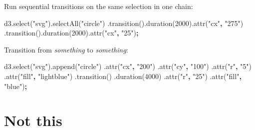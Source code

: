 \documentclass[openany]{book}
\newenvironment{Shaded}{\begin{snugshade}}{\end{snugshade}}
\newcommand{\AttributeTok}[1]{\textcolor[rgb]{0.77,0.63,0.00}{#1}}
\newcommand{\DecValTok}[1]{\textcolor[rgb]{0.00,0.00,0.81}{#1}}
\newcommand{\NormalTok}[1]{#1}
\newcommand{\OperatorTok}[1]{\textcolor[rgb]{0.81,0.36,0.00}{\textbf{#1}}}
\newcommand{\StringTok}[1]{\textcolor[rgb]{0.31,0.60,0.02}{#1}}
\newcommand{\VariableTok}[1]{\textcolor[rgb]{0.00,0.00,0.00}{#1}}
\begin{document}
Run sequential transitions on the same selection in one chain:

\begin{Shaded}
\begin{Highlighting}[]
\VariableTok{d3}\NormalTok{.}\AttributeTok{select}\NormalTok{(}\StringTok{"svg"}\NormalTok{).}\AttributeTok{selectAll}\NormalTok{(}\StringTok{"circle"}\NormalTok{)}
\NormalTok{  .}\AttributeTok{transition}\NormalTok{().}\AttributeTok{duration}\NormalTok{(}\DecValTok{2000}\NormalTok{).}\AttributeTok{attr}\NormalTok{(}\StringTok{"cx"}\OperatorTok{,} \StringTok{"275"}\NormalTok{)}
\NormalTok{  .}\AttributeTok{transition}\NormalTok{().}\AttributeTok{duration}\NormalTok{(}\DecValTok{2000}\NormalTok{).}\AttributeTok{attr}\NormalTok{(}\StringTok{"cx"}\OperatorTok{,} \StringTok{"25"}\NormalTok{)}\OperatorTok{;}
\end{Highlighting}
\end{Shaded}

Transition from \emph{something} to \emph{something}:

\begin{Shaded}
\begin{Highlighting}[]
\VariableTok{d3}\NormalTok{.}\AttributeTok{select}\NormalTok{(}\StringTok{"svg"}\NormalTok{).}\AttributeTok{append}\NormalTok{(}\StringTok{"circle"}\NormalTok{)}
\NormalTok{    .}\AttributeTok{attr}\NormalTok{(}\StringTok{"cx"}\OperatorTok{,} \StringTok{"200"}\NormalTok{)}
\NormalTok{    .}\AttributeTok{attr}\NormalTok{(}\StringTok{"cy"}\OperatorTok{,} \StringTok{"100"}\NormalTok{)}
\NormalTok{    .}\AttributeTok{attr}\NormalTok{(}\StringTok{"r"}\OperatorTok{,} \StringTok{"5"}\NormalTok{)}
\NormalTok{    .}\AttributeTok{attr}\NormalTok{(}\StringTok{"fill"}\OperatorTok{,} \StringTok{"lightblue"}\NormalTok{)}
\NormalTok{    .}\AttributeTok{transition}\NormalTok{()}
\NormalTok{    .}\AttributeTok{duration}\NormalTok{(}\DecValTok{4000}\NormalTok{)}
\NormalTok{    .}\AttributeTok{attr}\NormalTok{(}\StringTok{"r"}\OperatorTok{,} \StringTok{"25"}\NormalTok{)}
\NormalTok{    .}\AttributeTok{attr}\NormalTok{(}\StringTok{"fill"}\OperatorTok{,} \StringTok{"blue"}\NormalTok{)}\OperatorTok{;}
\end{Highlighting}
\end{Shaded}

\hypertarget{not-this}{%
\section{Not this}\label{not-this}}
\end{document}
